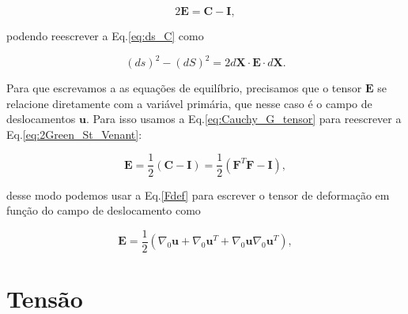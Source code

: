 \begin{equation}
	2\mathbf{E} = \mathbf{C} - \mathbf{I},
	\label{eq:2Green_St_Venant}
\end{equation}

podendo reescrever a Eq.\eqref{eq:ds_C} como

\begin{equation}
	(ds)^2 - (dS)^2 = 2 d\mathbf{X} \cdot \mathbf{E} \cdot d\mathbf{X}.
\end{equation}

Para que escrevamos a as equações de equilíbrio, precisamos que o tensor $\mathbf{E}$ se relacione diretamente com a variável primária, que nesse caso é o campo de deslocamentos $\mathbf{u}$. Para isso usamos a Eq.\eqref{eq:Cauchy_G_tensor} para reescrever a Eq.\eqref{eq:2Green_St_Venant}:

\begin{equation}
	\mathbf{E} = \frac{1}{2} (\mathbf{C} - \mathbf{I}) =
	\frac{1}{2} (\mathbf{F}^T \mathbf{F} - \mathbf{I}), 	
\end{equation}

desse modo podemos usar a Eq.\eqref{Fdef} para escrever o tensor de deformação em função do campo de deslocamento como

\begin{equation}
	\mathbf{E} = \frac{1}{2} \left( \nabla_0 \mathbf{u} + \nabla_0 \mathbf{u}^T + \nabla_0 \mathbf{u} \nabla_0 \mathbf{u}^T \right),
\end{equation}

\section{Tensão}


